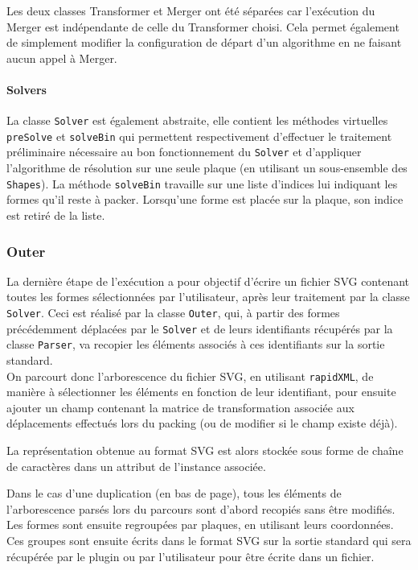 Les deux classes Transformer et Merger ont été séparées car l'exécution du Merger est indépendante de celle du Transformer choisi. Cela permet également de simplement modifier la configuration de départ d'un algorithme en ne faisant aucun appel à Merger.


\paragraph{Solvers}

La classe \texttt{Solver} est également abstraite, elle contient les méthodes virtuelles \texttt{preSolve} et \texttt{solveBin} qui permettent respectivement d'effectuer le traitement préliminaire nécessaire au bon fonctionnement du \texttt{Solver} et d'appliquer l'algorithme de résolution sur une seule plaque (en utilisant un sous-ensemble des \texttt{Shapes}).
La méthode \texttt{solveBin} travaille sur une liste d'indices lui indiquant les formes qu'il reste à packer. Lorsqu'une forme est placée sur la plaque, son indice est retiré de la liste.


\subsubsection{Outer}

La dernière étape de l'exécution a pour objectif d'écrire un fichier SVG contenant toutes les formes sélectionnées par l'utilisateur, après leur traitement par la classe \texttt{Solver}. Ceci est réalisé par la classe \texttt{Outer}, qui, à partir des formes précédemment déplacées par le \texttt{Solver} et de leurs identifiants récupérés par la classe \texttt{Parser}, va recopier les éléments associés à ces identifiants sur la sortie standard. \\

On parcourt donc l'arborescence du fichier SVG, en utilisant \texttt{rapidXML}, de manière à sélectionner les éléments en fonction de leur identifiant, pour ensuite ajouter un champ contenant la matrice de transformation associée aux déplacements effectués lors du packing (ou de modifier si le champ existe déjà).

La représentation obtenue au format SVG est alors stockée sous forme de chaîne de caractères dans un attribut de l'instance associée. %

Dans le cas d'une duplication (en bas de page), tous les éléments de l'arborescence parsés lors du parcours sont d'abord recopiés sans être modifiés. 
Les formes sont ensuite regroupées par plaques, en utilisant leurs coordonnées.
Ces groupes sont ensuite écrits dans le format SVG sur la sortie standard qui sera récupérée par le plugin ou par l'utilisateur pour être écrite dans un fichier.


